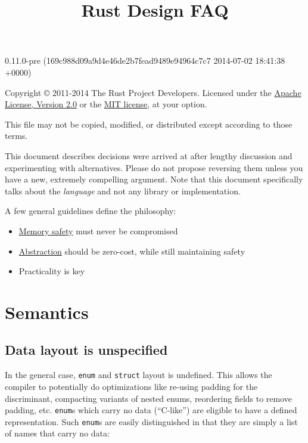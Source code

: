\documentclass[]{article}
\title{Rust Design FAQ}
\begin{document}
\maketitle

0.11.0-pre (169c988d09a9d4e46de2b7fead9489e94964c7c7 2014-07-02 18:41:38 +0000)

Copyright © 2011-2014 The Rust Project Developers. Licensed under the
\href{http://www.apache.org/licenses/LICENSE-2.0}{Apache License,
Version 2.0} or the \href{http://opensource.org/licenses/MIT}{MIT
license}, at your option.

This file may not be copied, modified, or distributed except according
to those terms.

{
\hypersetup{linkcolor=black}
\setcounter{tocdepth}{3}
\tableofcontents
}
This document describes decisions were arrived at after lengthy
discussion and experimenting with alternatives. Please do not propose
reversing them unless you have a new, extremely compelling argument.
Note that this document specifically talks about the \emph{language} and
not any library or implementation.

A few general guidelines define the philosophy:

\begin{itemize}
\itemsep1pt\parskip0pt
\item
  \href{http://en.wikipedia.org/wiki/Memory_safety}{Memory safety} must
  never be compromised
\item
  \href{http://en.wikipedia.org/wiki/Abstraction_\%28computer_science\%29}{Abstraction}
  should be zero-cost, while still maintaining safety
\item
  Practicality is key
\end{itemize}

\section{Semantics}\label{semantics}

\subsection{Data layout is
unspecified}\label{data-layout-is-unspecified}

In the general case, \texttt{enum} and \texttt{struct} layout is
undefined. This allows the compiler to potentially do optimizations like
re-using padding for the discriminant, compacting variants of nested
enums, reordering fields to remove padding, etc. \texttt{enum}s which
carry no data (``C-like'') are eligible to have a defined
representation. Such \texttt{enum}s are easily distinguished in that
they are simply a list of names that carry no data:
\end{document}

